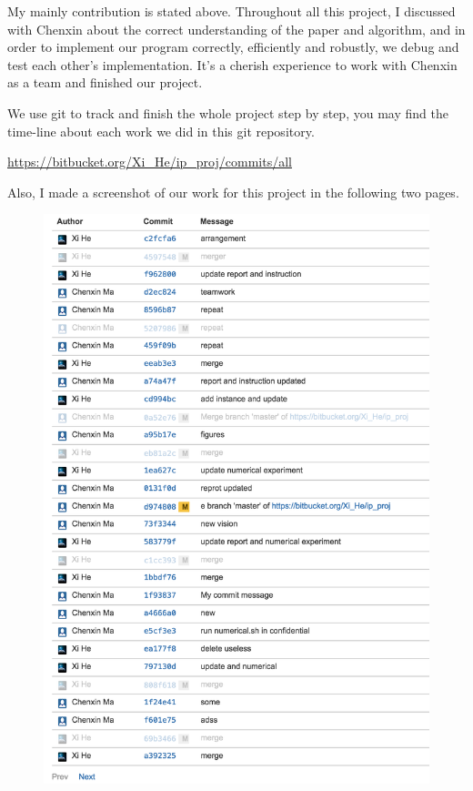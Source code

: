 \documentclass[a4paper,10pt]{article}
\begin{document}
My mainly contribution is stated above. Throughout all this project, I discussed with Chenxin about the correct understanding of the paper and algorithm, and in order to implement our program correctly, efficiently and robustly, we debug and test each other's implementation. It's a cherish experience to work with Chenxin as a team and finished our project.

We use git to track and finish the whole project step by step, you may find the time-line about each work we did in this git repository.

\url{https://bitbucket.org/Xi_He/ip_proj/commits/all}

Also, I made a screenshot of our work for this project in the following two pages.
\begin{figure}[H]
\begin{center}
\includegraphics[scale=0.8]{git_1}
\end{center}
\end{figure}
\end{document}
